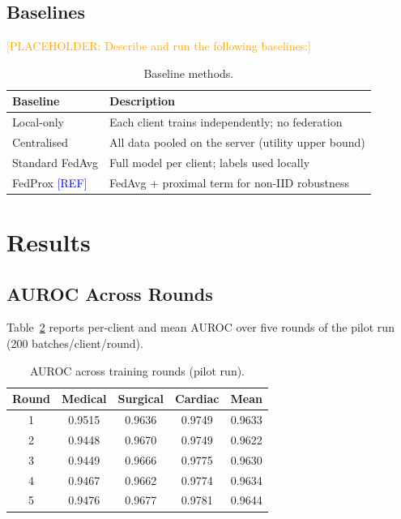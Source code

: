 \documentclass[10pt,twocolumn]{article}
\newcommand{\placeholder}[1]{\textcolor{orange}{[PLACEHOLDER: #1]}}
\newcommand{\refneeded}{\textcolor{blue}{[REF]}}
\begin{document}
\subsection{Baselines}
\label{sec:baselines}

\placeholder{Describe and run the following baselines:}

\begin{table}[h]
\centering
\caption{Baseline methods.}
\label{tab:baselines}
\begin{tabular}{ll}
\toprule
Baseline & Description \\
\midrule
Local-only      & Each client trains independently; no federation \\
Centralised     & All data pooled on the server (utility upper bound) \\
Standard FedAvg & Full model per client; labels used locally \\
FedProx \refneeded & FedAvg + proximal term for non-IID robustness \\
\bottomrule
\end{tabular}
\end{table}

\section{Results}
\label{sec:results}

\subsection{AUROC Across Rounds}

Table~\ref{tab:auroc} reports per-client and mean AUROC over five
rounds of the pilot run (200 batches/client/round).

\begin{table}[h]
\centering
\caption{AUROC across training rounds (pilot run).}
\label{tab:auroc}
\begin{tabular}{ccccc}
\toprule
Round & Medical & Surgical & Cardiac & Mean \\
\midrule
1 & 0.9515 & 0.9636 & 0.9749 & 0.9633 \\
2 & 0.9448 & 0.9670 & 0.9749 & 0.9622 \\
3 & 0.9449 & 0.9666 & 0.9775 & 0.9630 \\
4 & 0.9467 & 0.9662 & 0.9774 & 0.9634 \\
5 & 0.9476 & 0.9677 & 0.9781 & 0.9644 \\
\bottomrule
\end{tabular}
\end{table}
\end{document}
